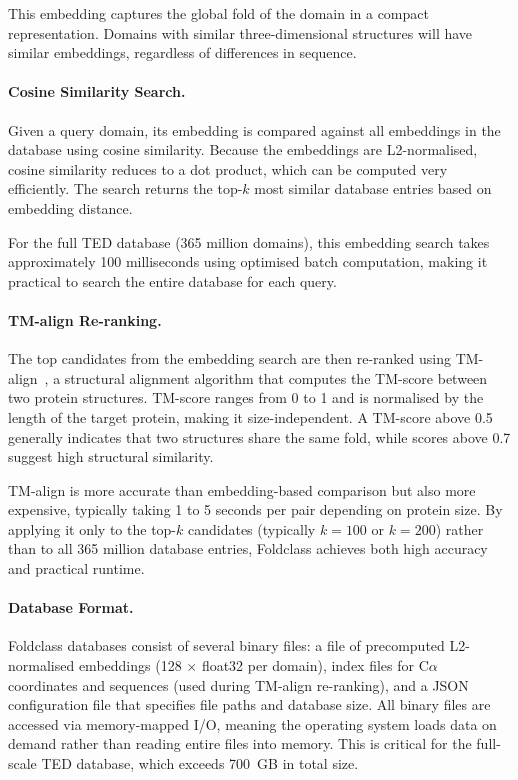 This embedding captures the global fold of the domain in a compact representation.
Domains with similar three-dimensional structures will have similar embeddings, regardless of differences in sequence.

\paragraph{Cosine Similarity Search.}
Given a query domain, its embedding is compared against all embeddings in the database using cosine similarity.
Because the embeddings are L2-normalised, cosine similarity reduces to a dot product, which can be computed very efficiently.
The search returns the top-$k$ most similar database entries based on embedding distance.

For the full TED database (365 million domains), this embedding search takes approximately 100 milliseconds using optimised batch computation, making it practical to search the entire database for each query.

\paragraph{TM-align Re-ranking.}
The top candidates from the embedding search are then re-ranked using TM-align~\cite{tmalign}, a structural alignment algorithm that computes the TM-score between two protein structures.
TM-score ranges from 0 to 1 and is normalised by the length of the target protein, making it size-independent.
A TM-score above 0.5 generally indicates that two structures share the same fold, while scores above 0.7 suggest high structural similarity.

TM-align is more accurate than embedding-based comparison but also more expensive, typically taking 1 to 5 seconds per pair depending on protein size.
By applying it only to the top-$k$ candidates (typically $k = 100$ or $k = 200$) rather than to all 365 million database entries, Foldclass achieves both high accuracy and practical runtime.

\paragraph{Database Format.}
Foldclass databases consist of several binary files: a file of precomputed L2-normalised embeddings (128 $\times$ float32 per domain), index files for C$\alpha$ coordinates and sequences (used during TM-align re-ranking), and a JSON configuration file that specifies file paths and database size.
All binary files are accessed via memory-mapped I/O, meaning the operating system loads data on demand rather than reading entire files into memory.
This is critical for the full-scale TED database, which exceeds 700~GB in total size.


